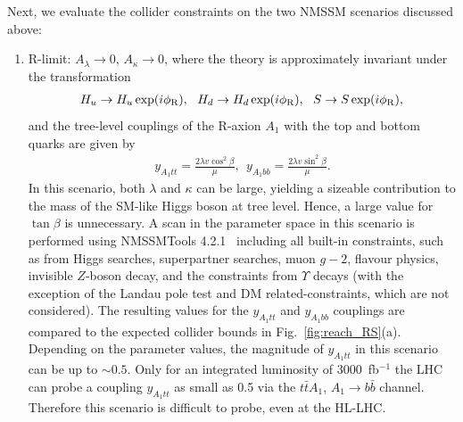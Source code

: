 \documentclass[preprintnumbers,superscriptaddress,nofootinbib,aps,prd,floatfix]{revtex4}
\begin{document}
Next, we evaluate the collider constraints on the two NMSSM scenarios discussed above:
\begin{enumerate}
\item R-limit: $A_\lambda \to 0$, $A_\kappa \to 0$, where the theory is approximately invariant under the transformation 
\begin{eqnarray}
H_u \to H_u \exp(i \phi_{\rm R}), \ \ H_d \to H_d \exp(i \phi_{\rm R}), \ \ S \to S \exp(i \phi_{\rm R}), 
\end{eqnarray}
and the tree-level couplings of the R-axion $A_1$ with the top and bottom quarks are given by  
\begin{eqnarray}
y_{A_1 tt} = \frac{2 \lambda v \cos^2 \beta}{\mu}, \ \  y_{A_1 bb} = \frac{2 \lambda v \sin^2 \beta}{\mu}.
\end{eqnarray}
In this scenario, both $\lambda$ and $\kappa$ can be large, yielding a sizeable contribution to the mass of the SM-like Higgs boson at tree level. Hence, a large value for $\tan\beta$ is unnecessary. A scan in the parameter space in this scenario is performed using NMSSMTools 4.2.1~\cite{NMSSMTools} including all built-in constraints, such as from Higgs searches, superpartner searches, muon $g-2$, flavour physics, invisible $Z$-boson decay, and the constraints from $\Upsilon$ decays (with the exception of the Landau pole test and DM related-constraints, which are not considered). 
The resulting values for the $y_{A_1tt}$ and $y_{A_1bb}$ couplings are compared to the expected collider bounds in Fig.~\ref{fig:reach_RS}(a).
Depending on the parameter values, the magnitude of $y_{A_1tt}$ in this scenario can be up to $\sim 0.5$. Only for an integrated luminosity of 3000~fb$^{-1}$ the LHC can probe a coupling $y_{A_1tt}$ as small as 0.5 via the $t\bar{t} A_1$, $A_1 \to b\bar{b}$ channel. Therefore this scenario is difficult to probe, even at the HL-LHC. 


\end{enumerate}
\end{document}
